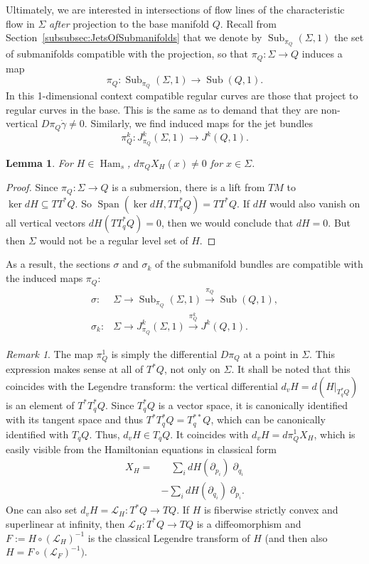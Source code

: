 \documentclass{amsart}
\newcommand{\Lcal}{{\mathcal{L}}}
\newcommand{\Ham}{\operatorname{Ham}}
\newcommand{\Sub}{\operatorname{Sub}}
\newtheorem{lemma}[proposition]{Lemma}
\theoremstyle{definition}
\theoremstyle{remark}
\newtheorem{remark}[proposition]{Remark}
\numberwithin{equation}{section}
\begin{document}
Ultimately, we are interested in intersections of flow lines of the characteristic flow in $\Sigma$ \emph{after} projection to the base manifold $Q$. Recall from Section~\ref{subsubsec:JetsOfSubmanifolds} that we denote by $\Sub_{\pi_Q}(\Sigma,1)$ the set of submanifolds compatible with the projection, so that $\pi_Q\colon \Sigma\to Q$ induces a map
$$\pi_Q:\Sub_{\pi_Q}(\Sigma,1)\to\Sub(Q,1).$$
In this 1-dimensional context compatible regular curves are those that project to regular curves in the base. This is the same as to demand that they are non-vertical $D\pi_Q\dot\gamma\neq 0$. Similarly, we find induced maps for the jet bundles 
$$\pi_Q^k:J^k_{\pi_Q}(\Sigma,1)\to J^k(Q,1).$$
\begin{lemma}\label{lem:submersiveHam}
    For $H\in\Ham_s$, $d\pi_QX_H(x)\neq 0$ for $x\in\Sigma$.
\end{lemma} 
\begin{proof}    
Since $\pi_Q:\Sigma\to Q$ is a submersion, there is a lift from $TM$ to $\ker dH\subseteq TT^*Q$. So $\operatorname{Span}(\ker dH, TT_q^*Q)=TT^*Q$. If $dH$ would also vanish on all vertical vectors $dH(TT^*_qQ)=0$, then we would conclude that $dH=0$. But then $\Sigma$ would not be a regular level set of $H$. 
\end{proof}
As a result, the sections $\sigma$ and $\sigma_k$ of the submanifold bundles are compatible with the induced maps $\pi_Q$:
\begin{align*}
    \sigma\colon &\Sigma\to \Sub_{\pi_Q}(\Sigma,1) \stackrel{\pi_Q}\to\Sub(Q,1),\\
    \sigma_k\colon &\Sigma \to J^k_{\pi_Q}(\Sigma,1)\stackrel{\pi_Q^k}\to J^k(Q,1).
\end{align*}

\begin{remark}
    The map $\pi_Q^1$ is simply the differential $D\pi_Q$ at a point in $\Sigma$. This expression makes sense at all of $T^*Q$, not only on $\Sigma$. It shall be noted that this coincides with the Legendre transform: the vertical differential $d_vH=d(H|_{T^*_qQ})$ is an element of $T^*T^*_qQ$. Since $T^*_qQ$ is a vector space, it is canonically identified with its tangent space and thus $T^*T^*_qQ=T^{**}_qQ$, which can be canonically identified with $T_qQ$. Thus, $d_vH\in T_qQ$. It coincides with $d_vH=d\pi_Q^1X_H$, which is easily visible from the Hamiltonian equations in classical form 
    \begin{align*}
         X_H = &  \quad\sum_i  dH(\partial_{p_i}) \;\partial_{q_i}\\
                &-\sum_i  dH(\partial_{q_i}) \;\partial_{p_i}.
        \end{align*} 
    One can also set $d_vH=\Lcal_H:T^*Q\to TQ$. If $H$ is fiberwise strictly convex and superlinear at infinity, then $\Lcal_H:T^*Q\to TQ$ is a diffeomorphism and $F:=H\circ (\Lcal_H)^{-1}$ is the classical Legendre transform of $H$ (and then also $H= F\circ (\Lcal_F)^{-1})$. 
\end{remark}
\end{document}

